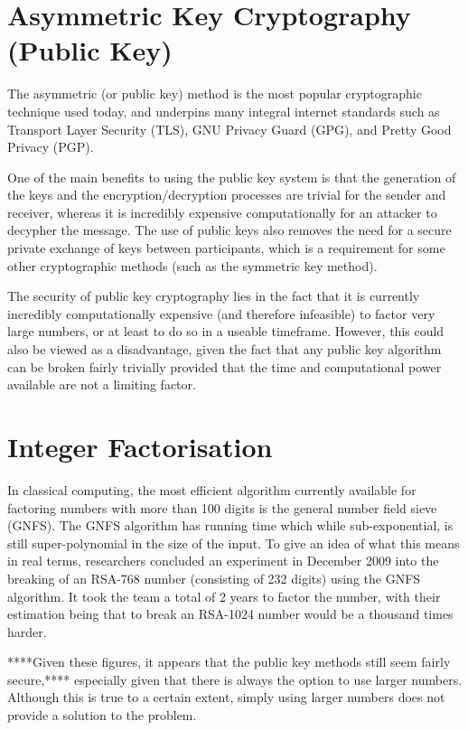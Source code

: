 \documentclass[runningheads,a4paper]{llncs}
\begin{document}
\section{Asymmetric Key Cryptography (Public Key)} 

The asymmetric (or public key) method is the most popular cryptographic technique used today, and underpins many integral internet standards such as Transport Layer Security (TLS), GNU Privacy Guard (GPG), and Pretty Good Privacy (PGP).

One of the main benefits to using the public key system is that the generation of the keys and the encryption/decryption processes are trivial for the sender and receiver, whereas it is incredibly expensive computationally for an attacker to decypher the message. The use of public keys also removes the need for a secure private exchange of keys between participants, which is a requirement for some other cryptographic methods (such as the symmetric key method).

The security of public key cryptography lies in the fact that it is currently incredibly computationally expensive (and therefore infeasible) to factor very large numbers, or at least to do so in a useable timeframe. However, this could also be viewed as a disadvantage, given the fact that any public key algorithm can be broken fairly trivially provided that the time and computational power available are not a limiting factor.

\section{Integer Factorisation}

In classical computing, the most efficient algorithm currently available for factoring numbers with more than 100 digits is the general number field sieve (GNFS). The GNFS algorithm has running time which while sub-exponential, is still super-polynomial in the size of the input. To give an idea of what this means in real terms, researchers concluded an experiment in December 2009 into the breaking of an RSA-768 number (consisting of 232 digits) using the GNFS algorithm. It took the team a total of 2 years to factor the number, with their estimation being that to break an RSA-1024 number would be a thousand times harder\cite{Kleinjung:2010:FRM:1881412.1881436}. 

****Given these figures, it appears that the public key methods still seem fairly secure,**** especially given that there is always the option to use larger numbers. Although this is true to a certain extent, simply using larger numbers does not provide a solution to the problem.
\end{document}
